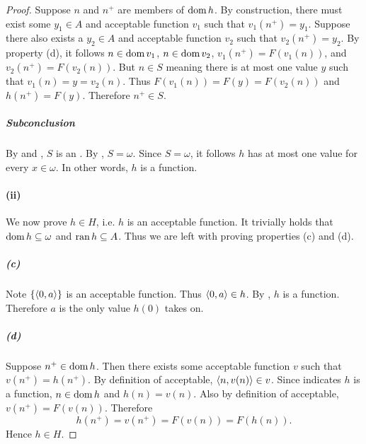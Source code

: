 \documentclass{report}
\begin{document}
\begin{proof}
        Suppose $n$ and $n^+$ are members of $\mathop{\text{dom}}{h}$.
        By construction, there must exist some $y_1 \in A$ and acceptable
          function $v_1$ such that $v_1(n^+) = y_1$.
        Suppose there also exists a $y_2 \in A$ and acceptable function $v_2$
          such that $v_2(n^+) = y_2$.
        By property (d), it follows $n \in \mathop{\text{dom}}{v_1}$, $n \in \mathop{\text{dom}}{v_2}$,
          $v_1(n^+) = F(v_1(n))$, and $v_2(n^+) = F(v_2(n))$.
        But $n \in S$ meaning there is at most one value $y$ such that
          $v_1(n) = y = v_2(n)$.
        Thus $F(v_1(n)) = F(y) = F(v_2(n))$ and $h(n^+) = F(y)$.
        Therefore $n^+ \in S$.

      \subparagraph{Subconclusion}%

        By  and
          , $S$ is an
          .
        By , $S = \omega$.
        Since $S = \omega$, it follows $h$ has at most one value for every
          $x \in \omega$.
        In other words, $h$ is a function.

    \paragraph{(ii)}%

      We now prove $h \in H$, i.e. $h$ is an acceptable function.
      It trivially holds that $\mathop{\text{dom}}{h} \subseteq \omega$ and
        $\mathop{\text{ran}}{h} \subseteq A$.
      Thus we are left with proving properties (c) and (d).

      \subparagraph{(c)}%

        Note $\{\left< 0, a \right>\}$ is an acceptable function.
        Thus $\left< 0, a \right> \in h$.
        By , $h$ is a function.
        Therefore $a$ is the only value $h(0)$ takes on.

      \subparagraph{(d)}%

        Suppose $n^+ \in \mathop{\text{dom}}{h}$.
        Then there exists some acceptable function $v$ such that
          $v(n^+) = h(n^+)$.
        By definition of acceptable, $\left< n, v(n) \right> \in v$.
        Since  indicates $h$ is
          a function, $n \in \mathop{\text{dom}}{h}$ and $h(n) = v(n)$.
        Also by definition of acceptable, $v(n^+) = F(v(n))$.
        Therefore $$h(n^+) = v(n^+) = F(v(n)) = F(h(n)).$$
        Hence $h \in H$.


\end{proof}
\end{document}

